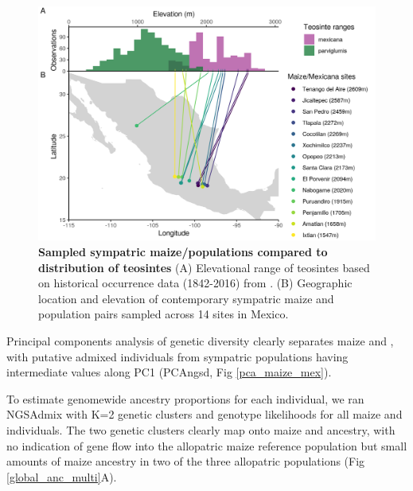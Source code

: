 \begin{figure}[ht]
\includegraphics[width=\textwidth]{chapter2/figures/mexico_lines_elev_teo_color.png}
\caption{\color{Gray} \textbf{Sampled sympatric maize/\mexicana populations compared to distribution of teosintes} (A) Elevational range of teosintes based on historical occurrence data (1842-2016) from \cite{Gonzalez:2018}. (B) Geographic location and elevation of contemporary sympatric maize and \mexicana population pairs sampled across 14 sites in Mexico.}
\label{map}
\end{figure}



Principal components analysis of genetic diversity clearly separates maize and \mexicana, with putative admixed individuals from sympatric populations having intermediate values along PC1 (PCAngsd, Fig \ref{pca_maize_mex}). 

To estimate genomewide ancestry proportions for each individual, we ran NGSAdmix \cite{Skotte:2013_NGSadmix} with K=2 genetic clusters and genotype likelihoods for all maize and \mexicana individuals.
The two genetic clusters clearly map onto maize and \mexicana ancestry, with no indication of gene flow into the allopatric maize reference population but small amounts of maize ancestry in two of the three allopatric \mexicana populations (Fig \ref{global_anc_multi}A). 


